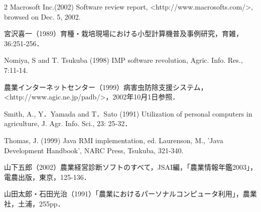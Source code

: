 \documentclass{jsaishoshiki}
\begin{document}
\begin{multicols}{2}
Macrosoft Inc.(2002) Software review report, <http://www.macrosofts.com/>, browsed on Dec. 5, 2002.

宮沢喜一（1989）育種・栽培現場における小型計算機普及事例研究，育雑，36:251-256．

Nomiya, S and T. Tsukuba (1998) IMP software revolution, Agric. Info. Res., 7:11-14.

農業インターネットセンター（1999）病害虫防除支援システム，<http://www.agic.ne.jp/padb/>，2002年10月1日参照．

Smith, A., Y．Yamada and T．Sato (1991) Utilization of personal computers in agriculture, J. Agr. Info. Sci., 23: 25-32．

Thomas, J. (1999) Java RMI implementation, ed. Laurenson, M., 'Java Development Handbook', NARC Press, Tsukuba, 321-340.

山下五郎（2002）農業経営診断ソフトのすべて，JSAI編，「農業情報年鑑2003」，電農出版，東京，125-136．

山田太郎・石田光治（1991）「農業におけるパーソナルコンピュータ利用」，農業社，土浦，255pp．

\end{multicols}
\end{document}
